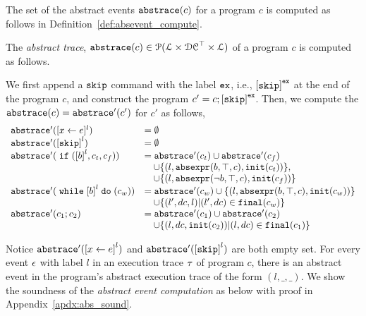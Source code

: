 The set of the abstract events $\mathtt{abs}{\mathtt{trace}}(c)$ for a program $c$
is computed as follows in Definition~\ref{def:absevent_compute}.
 \begin{defn}
 \label{def:psRB-absevent_compute}
 The \emph{abstract trace}, $\mathtt{abs}{\mathtt{trace}}(c) \in \mathcal{P}( \mathcal{L} \times \mathcal{DC}^{\top} \times \mathcal{L} )$ of a program $c$ is computed as follows.

 We first append a $\mathtt{skip}$ command with 
the label $\mathtt{ex}$, i.e., $\clabel{\eskip}^{{\lex}}$ at the end of the program $c$, and construct 
the program $c' = c;\clabel{\eskip}^{{\lex}}$.
Then, we compute the $\mathtt{abs}{\mathtt{trace}}(c) = \mathtt{abs}{\mathtt{trace}}'(c')$ for $c'$ as follows,
 {
 \[
 \begin{array}{ll}
 \absflow'(\clabel{\assign{x}{\expr}}{}^l) & = \emptyset \\
 \absflow'(\clabel{\eskip}^{l}) & = \emptyset \\
 \absflow'(\eif (\clabel{\bexpr}^l, c_t, c_f)) & = \absflow'(c_t) \cup \absflow'(c_f)
 \\ & \quad 
 \cup \left \{(l, \absexpr(\bexpr, \top, c), \absinit(c_t) ) \right \} , 
 \\ & \quad 
 \cup \left \{ (l, \absexpr(\neg\bexpr, \top, c), \absinit(c_f)) \right \} \\
 \absflow'(\ewhile \clabel{\bexpr}^l \edo (c_w)) & = \absflow'(c_w) \cup \{(l, \absexpr(\bexpr, \top, c), \absinit(c_w)) \} 
 \\ & \quad 
 \cup \{(l', dc, l)| (l', dc) \in \absfinal(c_w) \} \\
 \absflow'(c_1 ; c_2) & = \absflow'(c_1) \cup \absflow'(c_2) 
 \\ & \quad 
 \cup \{ (l, dc, \absinit(c_2)) | (l, dc) \in \absfinal(c_1) \} \\
 \end{array}
 \]
 }
 \end{defn}
 Notice $\absflow'(\clabel{\assign{x}{\expr}}^{l})$ and $\absflow'(\clabel{\eskip}^{l})$ are both empty set. 
 For every event $\mathtt{\epsilon}$ with label $l$ in an execution trace $\mathtt{\tau}$ of program $c$, 
 there is an abstract event in the program's abstract execution trace of the form $(l, \_, \_)$. 
 We show the soundness of the \emph{abstract event computation} as below with proof in Appendix~\ref{apdx:abs_sound}.
